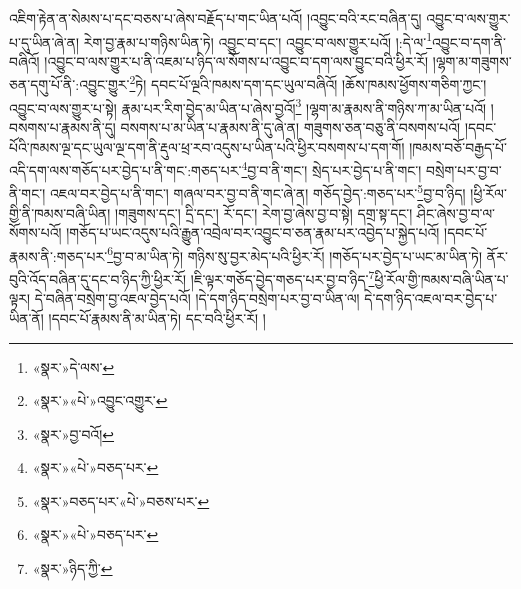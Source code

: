 འཇིག་རྟེན་ན་སེམས་པ་དང་བཅས་པ་ཞེས་བརྗོད་པ་གང་ཡིན་པའོ། །འབྱུང་བའི་རང་བཞིན་དུ། འབྱུང་བ་ལས་གྱུར་པ་དུ་ཡིན་ཞེ་ན། རེག་བྱ་རྣམ་པ་གཉིས་ཡིན་ཏེ། འབྱུང་བ་དང་། འབྱུང་བ་ལས་གྱུར་པའོ། །:དེ་ལ་\footnote{«སྣར་»དེ་ལས་}འབྱུང་བ་དག་ནི་བཞིའོ། །འབྱུང་བ་ལས་གྱུར་པ་ནི་འཇམ་པ་ཉིད་ལ་སོགས་པ་འབྱུང་བ་དག་ལས་བྱུང་བའི་ཕྱིར་རོ། །ལྷག་མ་གཟུགས་ཅན་དགུ་པོ་ནི་:འབྱུང་གྱུར་\footnote{«སྣར་»«པེ་»འབྱུང་འགྱུར་}ཏེ། དབང་པོ་ལྔའི་ཁམས་དག་དང་ཡུལ་བཞིའོ། །ཆོས་ཁམས་ཕྱོགས་གཅིག་ཀྱང་། འབྱུང་བ་ལས་གྱུར་པ་སྟེ། རྣམ་པར་རིག་བྱེད་མ་ཡིན་པ་ཞེས་བྱའོ།\footnote{«སྣར་»བྱ་བའོ།} །ལྷག་མ་རྣམས་ནི་གཉིས་ཀ་མ་ཡིན་པའོ། །བསགས་པ་རྣམས་ནི་དུ། བསགས་པ་མ་ཡིན་པ་རྣམས་ནི་དུ་ཞེ་ན། གཟུགས་ཅན་བཅུ་ནི་བསགས་པའོ། །དབང་པོའི་ཁམས་ལྔ་དང་ཡུལ་ལྔ་དག་ནི་རྡུལ་ཕྲ་རབ་འདུས་པ་ཡིན་པའི་ཕྱིར་བསགས་པ་དག་གོ། །ཁམས་བཅོ་བརྒྱད་པོ་འདི་དག་ལས་གཅོད་པར་བྱེད་པ་ནི་གང་:གཅད་པར་\footnote{«སྣར་»«པེ་»བཅད་པར་}བྱ་བ་ནི་གང་། སྲེད་པར་བྱེད་པ་ནི་གང་། བསྲེག་པར་བྱ་བ་ནི་གང་། འཇལ་བར་བྱེད་པ་ནི་གང་། གཞལ་བར་བྱ་བ་ནི་གང་ཞེ་ན། གཅོད་བྱེད་:གཅད་པར་\footnote{«སྣར་»བཅད་པར་«པེ་»བཅས་པར་}བྱ་བ་ཉིད། །ཕྱི་རོལ་གྱི་ནི་ཁམས་བཞི་ཡིན། །གཟུགས་དང་། དྲི་དང་། རོ་དང་། རེག་བྱ་ཞེས་བྱ་བ་སྟེ། དགྲ་སྟ་དང་། ཤིང་ཞེས་བྱ་བ་ལ་སོགས་པའོ། །གཅོད་པ་ཡང་འདུས་པའི་རྒྱུན་འབྲེལ་བར་འབྱུང་བ་ཅན་རྣམ་པར་འབྱེད་པ་སྐྱེད་པའོ། །དབང་པོ་རྣམས་ནི་:གཅད་པར་\footnote{«སྣར་»«པེ་»བཅད་པར་}བྱ་བ་མ་ཡིན་ཏེ། གཉིས་སུ་བྱར་མེད་པའི་ཕྱིར་རོ། །གཅོད་པར་བྱེད་པ་ཡང་མ་ཡིན་ཏེ། ནོར་བུའི་འོད་བཞིན་དུ་དང་བ་ཉིད་ཀྱི་ཕྱིར་རོ། །ཇི་ལྟར་གཅོད་བྱེད་གཅད་པར་བྱ་བ་ཉིད་\footnote{«སྣར་»ཉིད་ཀྱི་}ཕྱི་རོལ་གྱི་ཁམས་བཞི་ཡིན་པ་ལྟར། དེ་བཞིན་བསྲེག་བྱ་འཇལ་བྱེད་པའོ། །དེ་དག་ཉིད་བསྲེག་པར་བྱ་བ་ཡིན་ལ། དེ་དག་ཉིད་འཇལ་བར་བྱེད་པ་ཡིན་ནོ། །དབང་པོ་རྣམས་ནི་མ་ཡིན་ཏེ། དང་བའི་ཕྱིར་རོ། །

